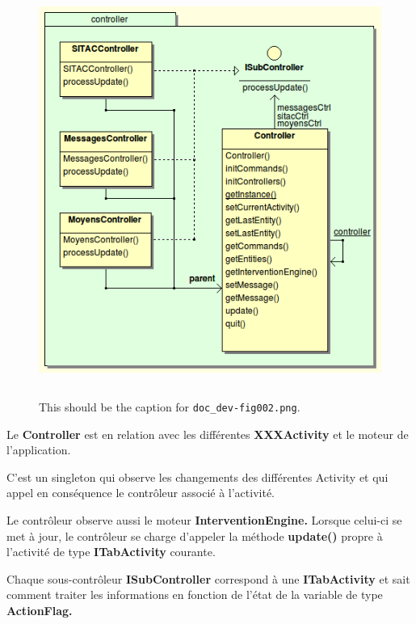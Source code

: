 \documentclass{article}
\begin{document}
\begin{figure}[htbp]
\begin{center}
\includegraphics[width=357pt, height=382pt]{doc_dev-fig002.png}
\caption{This should be the caption for \texttt{doc\_dev-fig002.png}.}
\end{center}
\end{figure}


\parindent=0pt
Le \textbf{Controller} est en relation avec les différentes \textbf{XXXActivity} et le moteur de l'application.

C'est un singleton qui observe les changements des différentes Activity et qui appel en conséquence le contrôleur associé à l'activité.

Le contrôleur observe aussi le moteur \textbf{InterventionEngine.} Lorsque celui-ci se met à jour, le contrôleur se charge d'appeler la méthode \textbf{update()} propre à l'activité de type \textbf{ITabActivity} courante.

Chaque sous-contrôleur \textbf{ISubController} correspond à une \textbf{ITabActivity} et sait comment traiter les informations en fonction de l'état de la variable de type \textbf{ActionFlag.}
\end{document}

